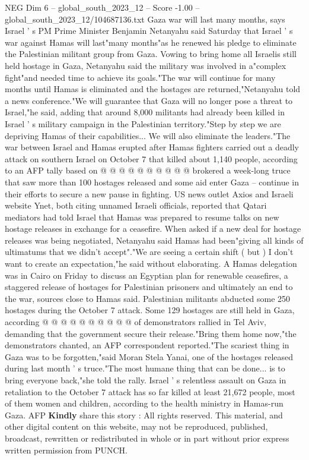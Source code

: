 \begin{textsample}{NEG Dim 6 – global\_south\_2023\_12 – Score -1.00 – global\_south\_2023\_12/104687136.txt}  \label{ex:f6_neg_355}
Gaza war will last many months, says Israel ' s PM Prime Minister Benjamin Netanyahu said Saturday that Israel ' s war against Hamas will last"many months"as he renewed his pledge to eliminate the Palestinian militant group from Gaza.
Vowing to bring home all Israelis still held hostage in Gaza, Netanyahu said the military was involved in a"complex fight"and needed time to achieve its goals."The war will continue for many months until Hamas is eliminated and the hostages are returned,"Netanyahu told a news conference."We will guarantee that Gaza will no longer pose a threat to Israel,"he said, adding that around 8,000 militants had already been killed in Israel ' s military campaign in the Palestinian territory."Step by step we are depriving Hamas of their capabilities...
We will also eliminate the leaders."The war between Israel and Hamas erupted after Hamas fighters carried out a deadly attack on southern Israel on October 7 that killed about 1,140 people, according to an AFP tally based on @ @ @ @ @ @ @ @ @ @ brokered a week-long truce that saw more than 100 hostages released and some aid enter Gaza -- continue in their efforts to secure a new pause in fighting.
US news outlet Axios and Israeli website Ynet, both citing unnamed Israeli officials, reported that Qatari mediators had told Israel that Hamas was prepared to resume talks on new hostage releases in exchange for a ceasefire.
When asked if a new deal for hostage releases was being negotiated, Netanyahu said Hamas had been"giving all kinds of ultimatums that we didn't accept"."We are seeing a certain shift ( but ) I don't want to create an expectation,"he said without elaborating.
A Hamas delegation was in Cairo on Friday to discuss an Egyptian plan for renewable ceasefires, a staggered release of hostages for Palestinian prisoners and ultimately an end to the war, sources close to Hamas said.
Palestinian militants abducted some 250 hostages during the October 7 attack.
Some 129 hostages are still held in Gaza, according @ @ @ @ @ @ @ @ @ @ of demonstrators rallied in Tel Aviv, demanding that the government secure their release."Bring them home now,"the demonstrators chanted, an AFP correspondent reported."The scariest thing in Gaza was to be forgotten,"said Moran Stela Yanai, one of the hostages released during last month ' s truce."The most humane thing that can be done... is to bring everyone back,"she told the rally.
Israel ' s relentless assault on Gaza in retaliation to the October 7 attack has so far killed at least 21,672 people, most of them women and children, according to the health ministry in Hamas-run Gaza.
AFP \textbf{Kindly} share this story : All rights reserved.
This material, and other digital content on this website, may not be reproduced, published, broadcast, rewritten or redistributed in whole or in part without prior express written permission from PUNCH.

\end{textsample}
